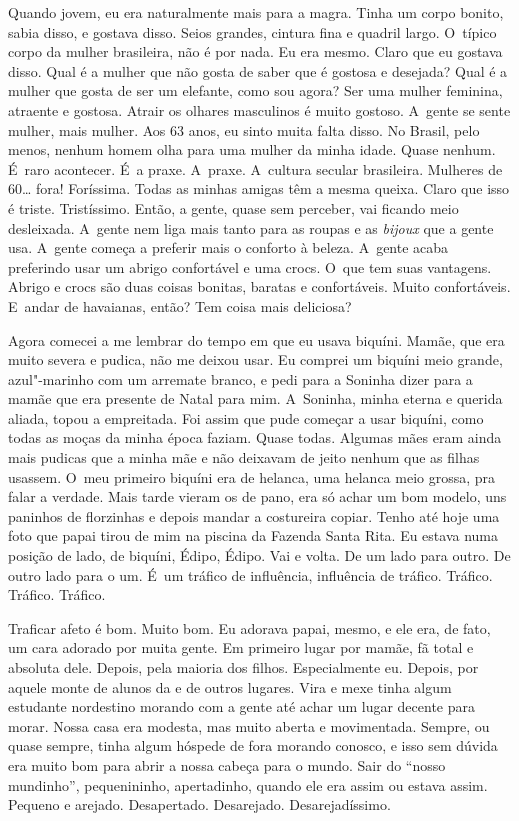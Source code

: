 Quando jovem, eu era naturalmente mais para a magra. Tinha um corpo
bonito, sabia disso, e gostava disso. Seios grandes, cintura fina e
quadril largo. O~típico corpo da mulher brasileira, não é por nada. Eu
era mesmo. Claro que eu gostava disso. Qual é a mulher que não gosta de
saber que é gostosa e desejada? Qual é a mulher que gosta de ser um
elefante, como sou agora? Ser uma mulher feminina, atraente e gostosa.
Atrair os olhares masculinos é muito gostoso. A~gente se sente mulher,
mais mulher. Aos 63 anos, eu sinto muita falta disso. No Brasil, pelo
menos, nenhum homem olha para uma mulher da minha idade. Quase nenhum. É~raro acontecer. É~a praxe. A~praxe. A~cultura secular brasileira.
Mulheres de 60… fora! Foríssima. Todas as minhas amigas têm a
mesma queixa. Claro que isso é triste. Tristíssimo. Então, a gente,
quase sem perceber, vai ficando meio desleixada. A~gente nem liga mais
tanto para as roupas e as \emph{bijoux} que a gente usa. A~gente começa
a preferir mais o conforto à beleza. A~gente acaba preferindo usar um
abrigo confortável e uma crocs. O~que tem suas vantagens. Abrigo e crocs
são duas coisas bonitas, baratas e confortáveis. Muito confortáveis. E~andar de havaianas, então? Tem coisa mais deliciosa?

Agora comecei a me lembrar do tempo em que eu usava biquíni. Mamãe, que
era muito severa e pudica, não me deixou usar. Eu comprei um biquíni
meio grande, azul"-marinho com um arremate branco, e pedi para a Soninha
dizer para a mamãe que era presente de Natal para mim. A~Soninha, minha
eterna e querida aliada, topou a empreitada. Foi assim que pude começar
a usar biquíni, como todas as moças da minha época faziam. Quase todas.
Algumas mães eram ainda mais pudicas que a minha mãe e não deixavam de
jeito nenhum que as filhas usassem. O~meu primeiro biquíni era de
helanca, uma helanca meio grossa, pra falar a verdade. Mais tarde vieram
os de pano, era só achar um bom modelo, uns paninhos de florzinhas e
depois mandar a costureira copiar. Tenho até hoje uma foto que papai
tirou de mim na piscina da Fazenda Santa Rita. Eu estava numa posição de
lado, de biquíni, Édipo, Édipo. Vai e volta. De um lado para outro. De
outro lado para o um. É~um tráfico de influência, influência de tráfico.
Tráfico. Tráfico. Tráfico.

Traficar afeto é bom. Muito bom. Eu adorava papai, mesmo, e ele era, de
fato, um cara adorado por muita gente. Em primeiro lugar por mamãe, fã
total e absoluta dele. Depois, pela maioria dos filhos. Especialmente
eu. Depois, por aquele monte de alunos da  e de outros lugares. Vira
e mexe tinha algum estudante nordestino morando com a gente até achar um
lugar decente para morar. Nossa casa era modesta, mas muito aberta e
movimentada. Sempre, ou quase sempre, tinha algum hóspede de fora
morando conosco, e isso sem dúvida era muito bom para abrir a nossa
cabeça para o mundo. Sair do ``nosso mundinho'', pequenininho,
apertadinho, quando ele era assim ou estava assim. Pequeno e arejado.
Desapertado. Desarejado. Desarejadíssimo.

